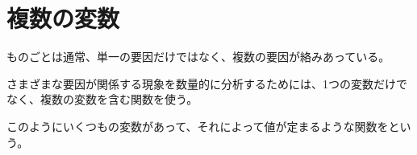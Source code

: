 \documentclass[../../../topic_calculus]{subfiles}
\begin{document}
\sectionline
\section{複数の変数}

ものごとは通常、単一の要因だけではなく、複数の要因が絡みあっている。

さまざまな要因が関係する現象を数量的に分析するためには、1つの変数だけでなく、複数の変数を含む関数を使う。

\br

このようにいくつもの変数があって、それによって値が定まるような関数をという。
\end{document}
